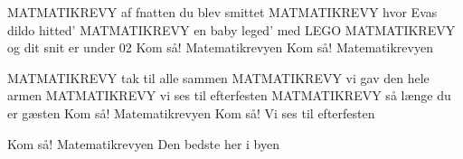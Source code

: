 \documentclass[a4paper,11pt]{article}
\begin{document}
\begin{song}
 MATMATIKREVY 
 af fnatten du blev smittet
 MATMATIKREVY 
 hvor Evas dildo hitted'
 MATMATIKREVY 
 en baby leged' med LEGO
 MATMATIKREVY
 og dit snit er under 02
 Kom så!
 Matematikrevyen
 Kom så!
Matematikrevyen

 MATMATIKREVY 
 tak til alle sammen
MATMATIKREVY 
 vi gav den hele armen
MATMATIKREVY 
 vi ses til efterfesten
MATMATIKREVY
 så længe du er gæsten
Kom så!
 Matematikrevyen
 Kom så!
 Vi ses til efterfesten

 Kom så!
 Matematikrevyen
Den bedste her i byen
\end{song}
\end{document}
